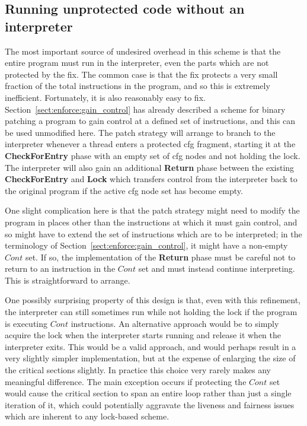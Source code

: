 \subsection{Running unprotected code without an interpreter}

The most important source of undesired overhead in this scheme is that
the entire program must run in the interpreter, even the parts which
are not protected by the fix.  The common case is that the fix
protects a very small fraction of the total instructions in the
program, and so this is extremely inefficient.  Fortunately, it is
also reasonably easy to fix.  Section~\ref{sect:enforce:gain_control}
has already described a scheme for binary patching a program to gain
control at a defined set of instructions, and this can be used
unmodified here.  The patch strategy will arrange to branch to the
interpreter whenever a thread enters a protected \gls{cfg} fragment,
starting it at the \textbf{CheckForEntry} phase with an empty set of
\gls{cfg} nodes and not holding the lock.  The interpreter will also gain an
additional \textbf{Return} phase between the existing
\textbf{CheckForEntry} and \textbf{Lock} which transfers control from
the interpreter back to the original program if the active \gls{cfg} node
set has become empty.

One slight complication here is that the patch strategy might need to
modify the program in places other than the instructions at which it
must gain control, and so might have to extend the set of instructions
which are to be interpreted; in the terminology of
Section~\ref{sect:enforce:gain_control}, it might have a non-empty
$\mathit{Cont}$ set.  If so, the implementation of the \textbf{Return}
phase must be careful not to return to an instruction in the
$\mathit{Cont}$ set and must instead continue interpreting.  This is
straightforward to arrange.

One possibly surprising property of this design is that, even with
this refinement, the interpreter can still sometimes run while not
holding the lock if the program is executing $\mathit{Cont}$
instructions.  An alternative approach would be to simply acquire the
lock when the interpreter starts running and release it when the
interpreter exits.  This would be a valid approach, and would perhaps
result in a very slightly simpler implementation, but at the expense
of enlarging the size of the critical sections slightly.  In practice
this choice very rarely makes any meaningful difference.  The main
exception occurs if protecting the $\mathit{Cont}$ set would cause the
critical section to span an entire loop rather than just a single
iteration of it, which could potentially aggravate the liveness and
fairness issues which are inherent to any lock-based scheme.


